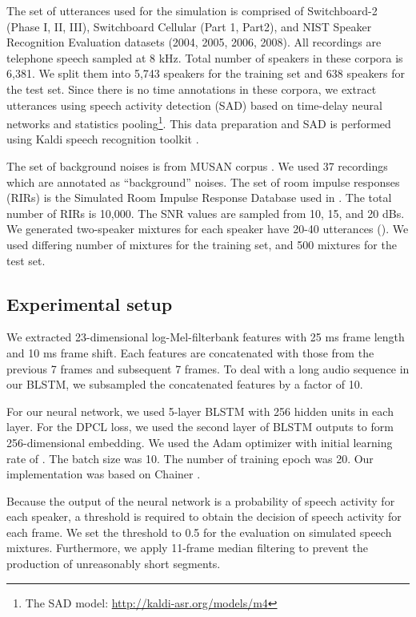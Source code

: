 \documentclass[a4paper]{article}
\begin{document}
The set of utterances used for the simulation is comprised of Switchboard-2 (Phase I, II, III), Switchboard Cellular (Part 1, Part2), and NIST Speaker Recognition Evaluation datasets (2004, 2005, 2006, 2008). All recordings are telephone speech sampled at 8 kHz.
Total number of speakers in these corpora is 6,381.
We split them into 5,743 speakers for the training set and 638 speakers for the test set.
Since there is no time annotations in these corpora, we extract utterances using speech activity detection (SAD) based on time-delay neural networks and statistics pooling\footnote{The SAD model: \url{http://kaldi-asr.org/models/m4}}. This data preparation and SAD is performed using Kaldi speech recognition toolkit \cite{Povey_ASRU2011}.

The set of background noises is from MUSAN corpus \cite{Snyder2015}. We used 37 recordings which are annotated as ``background'' noises.
The set of room impulse responses (RIRs) is the Simulated Room Impulse Response Database used in \cite{Ko2017}. The total number of RIRs is 10,000.
The SNR values are sampled from 10, 15, and 20 dBs.
We generated two-speaker mixtures for each speaker have 20-40 utterances ().
We used differing number of mixtures for the training set, and 500 mixtures for the test set.

\subsection{Experimental setup}
We extracted 23-dimensional log-Mel-filterbank features with 25 ms frame length and 10 ms frame shift.
Each features are concatenated with those from the previous 7 frames and subsequent 7 frames.
To deal with a long audio sequence in our BLSTM, we subsampled the concatenated features by a factor of 10.

For our neural network, we used 5-layer BLSTM with 256 hidden units in each layer. For the DPCL loss, we used the second layer of BLSTM outputs to form 256-dimensional embedding.
We used the Adam \cite{Kingma2014} optimizer with initial learning rate of .
The batch size was 10.
The number of training epoch was 20.
Our implementation was based on Chainer \cite{chainer_learningsys2015}.

Because the output of the neural network is a probability of speech activity for each speaker, a threshold is required to obtain the decision of speech activity for each frame. We set the threshold to 0.5 for the evaluation on simulated speech mixtures.
Furthermore, we apply 11-frame median filtering to prevent the production of unreasonably short segments.
\end{document}
